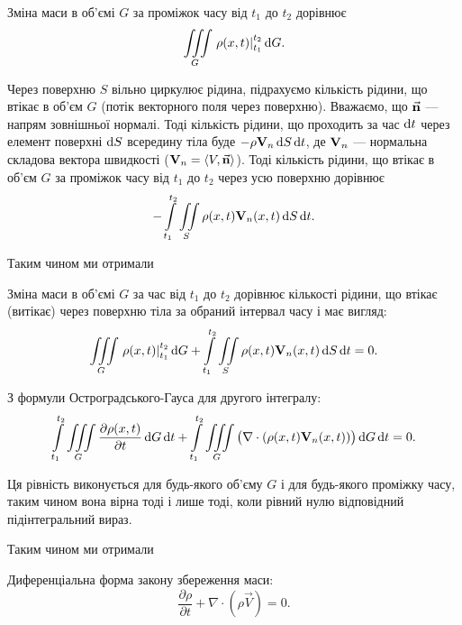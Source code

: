 Зміна маси в об'ємі $G$ за проміжок часу від $t_1$ до $t_2$ дорівнює 
\begin{equation}
	\Iiint_G \left. \rho(x, t) \right|_{t_1}^{t_2} \diff G.
\end{equation}

Через поверхню $S$ вільно циркулює рідина, підрахуємо кількість рідини, що втікає в об'єм $G$ (потік векторного поля через поверхню). Вважаємо, що $\vec{\bf{n}}$ --- напрям зовнішньої нормалі. Тоді кількість рідини, що проходить за час $\diff t$ через елемент поверхні $\diff S$ всередину тіла буде $- \rho \bf{V}_n \diff S \diff t$, де $\bf{V}_n$ --- нормальна складова вектора швидкості ($\bf{V}_n = \langle V, \vec{\bf{n}} \rangle$). Тоді кількість рідини, що втікає в об'єм $G$ за проміжок часу від $t_1$ до $t_2$ через усю поверхню дорівнює
\begin{equation}
	-\Int_{t_1}^{t_2} \Iint_S \rho(x, t) \bf{V}_n(x, t) \diff S \diff t.
\end{equation}

Таким чином ми отримали
\begin{law}
	Зміна маси в об'ємі $G$ за час від $t_1$ до $t_2$ дорівнює кількості рідини, що втікає (витікає) через поверхню тіла за обраний інтервал часу і має вигляд:
	\begin{equation}
		\Iiint_G \left. \rho(x, t) \right|_{t_1}^{t_2} \diff G + \Int_{t_1}^{t_2} \Iint_S \rho(x, t) \bf{V}_n(x, t) \diff S \diff t = 0.
	\end{equation}
\end{law}

З формули Остроградського-Гауса для другого інтегралу:
\begin{equation}
	\Int_{t_1}^{t_2} \Iiint_G \frac{\partial \rho(x, t)}{\partial t} \diff G \diff t+ \Int_{t_1}^{t_2} \Iiint_G \big( \nabla \cdot ( \rho(x, t) \bf{V}_n(x, t)) \big) \diff G \diff t = 0.
\end{equation}

Ця рівність виконується для будь-якого об'єму $G$ і для будь-якого проміжку часу, таким чином вона вірна тоді і лише тоді, коли рівний нулю відповідний підінтегральний вираз. \medskip

Таким чином ми отримали
\begin{th_equation}[нерозривності]
	Диференціальна форма закону збереження маси:
	\begin{equation}
		\frac{\partial \rho}{\partial t} + \nabla \cdot \left( \rho \vec V \right) = 0.
	\end{equation}
\end{th_equation}

